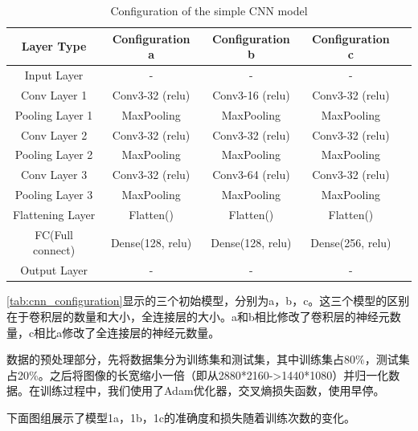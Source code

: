 \begin{table}
\centering
\caption{Configuration of the simple CNN model}
\begin{tabular}{ccccc}
    \toprule
    \textbf{Layer Type} & \textbf{Configuration a} & \textbf{Configuration b} & \textbf{Configuration c} \\
    \midrule
    Input Layer & - & - & - \\
    Conv Layer 1 & Conv3-32 (relu) & Conv3-16 (relu) & Conv3-32 (relu) \\
    Pooling Layer 1 & MaxPooling & MaxPooling& MaxPooling \\
    Conv Layer 2 & Conv3-32 (relu) & Conv3-32 (relu) & Conv3-32 (relu) \\
    Pooling Layer 2 & MaxPooling & MaxPooling& MaxPooling \\
    Conv Layer 3 & Conv3-32 (relu) & Conv3-64 (relu) & Conv3-32 (relu) \\
    Pooling Layer 3 & MaxPooling & MaxPooling& MaxPooling \\
    Flattening Layer & Flatten() & Flatten() & Flatten() \\
    FC(Full connect) & Dense(128, relu) & Dense(128, relu) & Dense(256, relu) \\
    Output Layer & - & - & - \\
    \bottomrule
\end{tabular}
\label{tab:cnn_configuration}
\end{table}

\autoref{tab:cnn_configuration}显示的三个初始模型，分别为a，b，c。这三个模型的区别在于卷积层的数量和大小，全连接层的大小。a和b相比修改了卷积层的神经元数量，c相比a修改了全连接层的神经元数量。

数据的预处理部分，先将数据集分为训练集和测试集，其中训练集占80\%，测试集占20\%。之后将图像的长宽缩小一倍（即从2880*2160->1440*1080）并归一化数据。在训练过程中，我们使用了Adam优化器，交叉熵损失函数，使用早停。

下面图组展示了模型1a，1b，1c的准确度和损失随着训练次数的变化。

